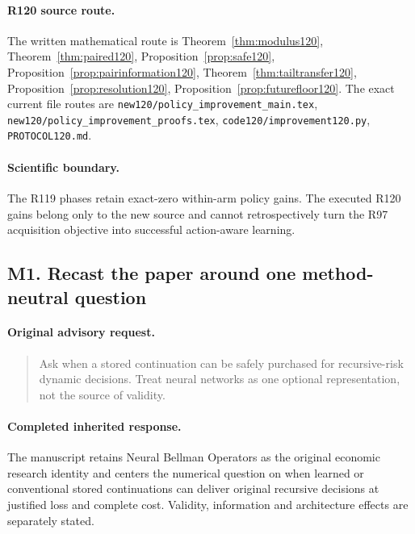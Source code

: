 \paragraph{R120 source route.}
The written mathematical route is Theorem~\ref{thm:modulus120}, Theorem~\ref{thm:paired120}, Proposition~\ref{prop:safe120}, Proposition~\ref{prop:pairinformation120}, Theorem~\ref{thm:tailtransfer120}, Proposition~\ref{prop:resolution120}, Proposition~\ref{prop:futurefloor120}. The exact current file routes are \nolinkurl{new120/policy_improvement_main.tex}, \nolinkurl{new120/policy_improvement_proofs.tex}, \nolinkurl{code120/improvement120.py}, \nolinkurl{PROTOCOL120.md}.
\paragraph{Scientific boundary.}
The R119 phases retain exact-zero within-arm policy gains. The executed R120 gains belong only to the new source and cannot retrospectively turn the R97 acquisition objective into successful action-aware learning.

\subsection{M1. Recast the paper around one method-neutral question}
\label{response120:M1}
\paragraph{Original advisory request.}
\begin{quote}
Ask when a stored continuation can be safely purchased for recursive-risk dynamic decisions. Treat neural networks as one optional representation, not the source of validity.
\end{quote}
\paragraph{Completed inherited response.}
The manuscript retains Neural Bellman Operators as the original economic research identity and centers the numerical question on when learned or conventional stored continuations can deliver original recursive decisions at justified loss and complete cost. Validity, information and architecture effects are separately stated.
